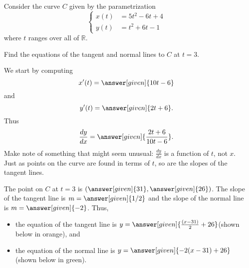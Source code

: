 \documentclass{ximera}
\begin{document}
\begin{example}
Consider the curve $C$ given by the parametrization
\[ 
\begin{cases}
x(t)&=5t^2-6t+4 \\
y(t)&=t^2+6t-1
\end{cases}
\]
where $t$ ranges over all of $\mathbb{R}$. 

 Find the equations of the tangent and normal lines
  to $C$ at $t=3$.
  \begin{explanation}
    We start by computing
    \[
    x'(t) = \answer[given]{10t-6}
    \]
    and
    \[
    y'(t) =\answer[given]{2t+6}.
    \]
    Thus
    \[
    \frac{dy}{dx} = \answer[given]{\frac{2t+6}{10t-6}}.
    \]
    Make note of something that might seem unusual: $\frac{dy}{dx}$ is a
    function of $t$, not $x$. Just as points on the curve are found in
    terms of $t$, so are the slopes of the tangent lines.
		
    The point on $C$ at $t=3$ is $(\answer[given]{31},\answer[given]{26})$. The slope of the tangent
    line is $m=\answer[given]{1/2}$ and the slope of the normal line is $m=\answer[given]{-2}$. Thus,
    \begin{itemize}
    \item the equation of the tangent line is
      $y=\answer[given]{\frac{(x-31)}{2}+26}$(shown below in orange), and
    \item the equation of the normal line is
      $y=\answer[given]{-2(x-31)+26}$(shown below in green).
    \end{itemize}
  \end{explanation}


\begin{image}
\end{image}



\end{example}
\end{document}
